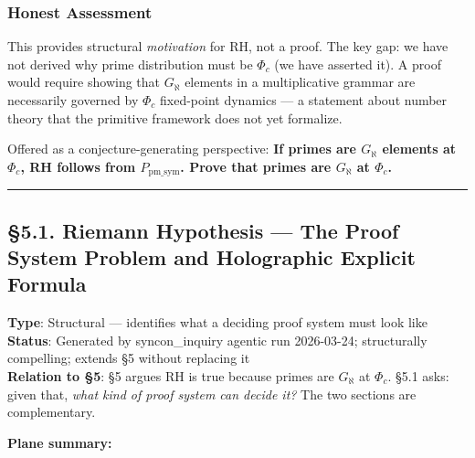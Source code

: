 \documentclass[12pt,a4paper]{article}
\newcommand{\pilcrow}{\S}
\begin{document}
\subsubsection{Honest Assessment}

This provides structural \emph{motivation} for RH, not a proof. The key gap: we have not derived why prime distribution must be $\Phi_c$ (we have asserted it). A proof would require showing that $G_{\aleph}$ elements in a multiplicative grammar are necessarily governed by $\Phi_c$ fixed-point dynamics --- a statement about number theory that the primitive framework does not yet formalize.

Offered as a conjecture-generating perspective: \textbf{If primes are $G_{\aleph}$ elements at $\Phi_c$, RH follows from $P_{\text{pm\_sym}}$. Prove that primes are $G_{\aleph}$ at $\Phi_c$.}

\begin{center}
\rule{0.5\textwidth}{0.4pt}
\end{center}

\subsection{\pilcrow{}5.1. Riemann Hypothesis --- The Proof System Problem and Holographic Explicit Formula}

\textbf{Type}: Structural --- identifies what a deciding proof system must look like   \\
\textbf{Status}: Generated by syncon\_inquiry agentic run 2026-03-24; structurally compelling; extends \pilcrow{}5 without replacing it   \\
\textbf{Relation to \pilcrow{}5}: \pilcrow{}5 argues RH is true because primes are $G_{\aleph}$ at $\Phi_c$. \pilcrow{}5.1 asks: given that, \emph{what kind of proof system can decide it?} The two sections are complementary.

\textbf{Plane summary:}
\end{document}
